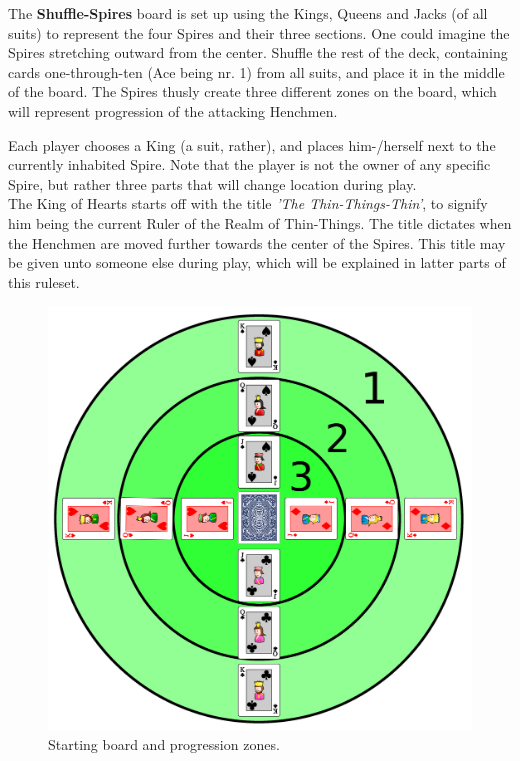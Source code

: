 \documentclass[11pt,twocolumn]{article}
\begin{document}
\noindent
The \textbf{Shuffle-Spires} board is set up using the Kings, Queens and Jacks (of all suits) to represent the four Spires and their three sections.
One could imagine the Spires stretching outward from the center.
Shuffle the rest of the deck, containing cards one-through-ten (Ace being nr. 1) from all suits, and place it in the middle of the board.
The Spires thusly create three different zones on the board, which will represent progression of the attacking Henchmen.

Each player chooses a King (a suit, rather), and places him-/herself next to the currently inhabited Spire.
Note that the player is not the owner of any specific Spire, but rather three parts that will change location during play.\\

\noindent
The King of Hearts starts off with the title \textit{'The Thin-Things-Thin'}, to signify him being the current Ruler of the Realm of Thin-Things.
The title dictates when the Henchmen are moved further towards the center of the Spires.
This title may be given unto someone else during play, which will be explained in latter parts of this ruleset.

\begin{figure}[h!]
\centering
\includegraphics[width=\linewidth]{starting.png}
\caption{Starting board and progression zones.}
\label{fig:starting}
\end{figure}
\end{document}
